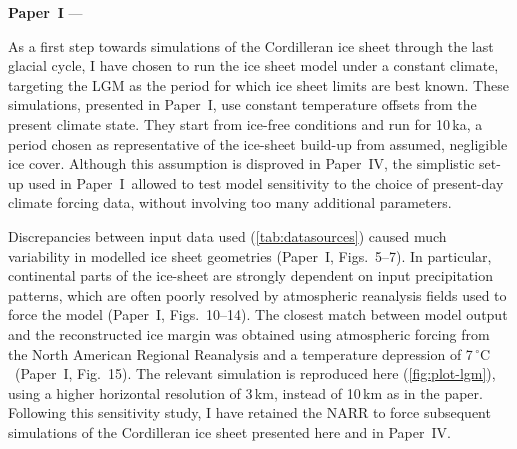 \documentclass{article}
\newcommand{\unit}[1]{\ensuremath{\mathrm{#1}}}
\newcommand{\degree}[0]{\ensuremath{^{\circ}}}
\newcommand{\degC}[0]{\unit{{\degree}C}}
\newcommand{\CCLI}[0]{Paper~I}      %
\newcommand{\CCYC}[0]{Paper~IV}     %
\begin{document}
\noindent\textbf{\CCLI} --- 
\bigskip

As a first step towards simulations of the Cordilleran ice sheet through the
last glacial cycle, I have chosen to run the ice sheet model under a constant
climate, targeting the LGM as the period for which ice sheet limits are best
known. These simulations, presented in \CCLI, use constant temperature offsets
from the present climate state. They start from ice-free conditions and run for
10\,ka, a period chosen as representative of the ice-sheet build-up from
assumed, negligible ice cover. Although this assumption is disproved in \CCYC,
the simplistic set-up used in \CCLI\ allowed to test model sensitivity to the
choice of present-day climate forcing data, without involving too many
additional parameters.

Discrepancies between input data used (\cref{tab:datasources}) caused much
variability in modelled ice sheet geometries (\CCLI, Figs.~5--7). In
particular, continental parts of the ice-sheet are strongly dependent on input
precipitation patterns, which are often poorly resolved by atmospheric
reanalysis fields used to force the model (\CCLI, Figs.~10--14). The closest
match between model output and the reconstructed ice margin \citep{Dyke.2004}
was obtained using atmospheric forcing from the North American Regional
Reanalysis \citep[NARR,][]{Mesinger.etal.2006} and a temperature depression of
7\,\degC\ (\CCLI, Fig.~15). The relevant simulation is reproduced here
(\cref{fig:plot-lgm}), using a higher horizontal resolution of 3\,km, instead
of 10\,km as in the paper. Following this sensitivity study, I have retained
the NARR to force subsequent simulations of the Cordilleran ice sheet
presented here and in \CCYC.
\end{document}
